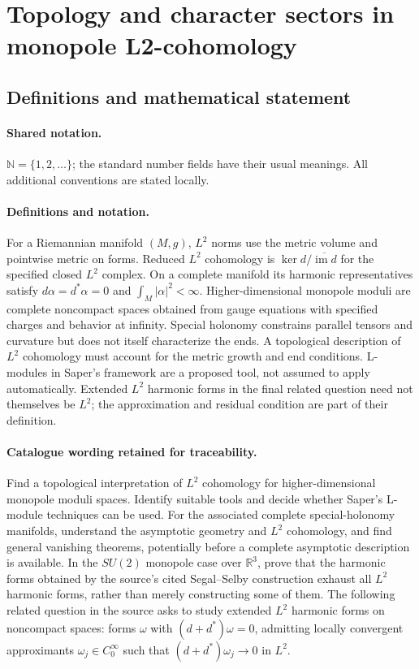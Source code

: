 \documentclass[11pt]{article}
\begin{document}
\section{Topology and character sectors in monopole L2-cohomology}\label{statement}

\subsection{Definitions and mathematical statement}

\paragraph{Shared notation.}$\mathbb N=\{1,2,\ldots\}$; the standard number fields have their usual meanings. All additional conventions are stated locally.


\paragraph{Definitions and notation.}For a Riemannian manifold $(M,g)$, $L^2$ norms use the metric volume and pointwise metric on forms. Reduced $L^2$ cohomology is $\ker d/\overline{\operatorname{im}d}$ for the specified closed $L^2$ complex. On a complete manifold its harmonic representatives satisfy $d\alpha=d^*\alpha=0$ and $\int_M|\alpha|^2<\infty$. Higher-dimensional monopole moduli are complete noncompact spaces obtained from gauge equations with specified charges and behavior at infinity. Special holonomy constrains parallel tensors and curvature but does not itself characterize the ends. A topological description of $L^2$ cohomology must account for the metric growth and end conditions. L-modules in Saper’s framework are a proposed tool, not assumed to apply automatically. Extended $L^2$ harmonic forms in the final related question need not themselves be $L^2$; the approximation and residual condition are part of their definition.

\paragraph{Catalogue wording retained for traceability.}
Find a topological interpretation of $L^2$ cohomology for higher-dimensional monopole moduli spaces. Identify suitable tools and decide whether Saper’s L-module techniques can be used. For the associated complete special-holonomy manifolds, understand the asymptotic geometry and $L^2$ cohomology, and find general vanishing theorems, potentially before a complete asymptotic description is available. In the $SU(2)$ monopole case over $\mathbb R^3$, prove that the harmonic forms obtained by the source's cited Segal--Selby construction exhaust all $L^2$ harmonic forms, rather than merely constructing some of them. The following related question in the source asks to study extended $L^2$ harmonic forms on noncompact spaces: forms $\omega$ with $(d+d^*)\omega=0$, admitting locally convergent approximants $\omega_j\in C_0^\infty$ such that $(d+d^*)\omega_j\to0$ in $L^2$.
\end{document}
